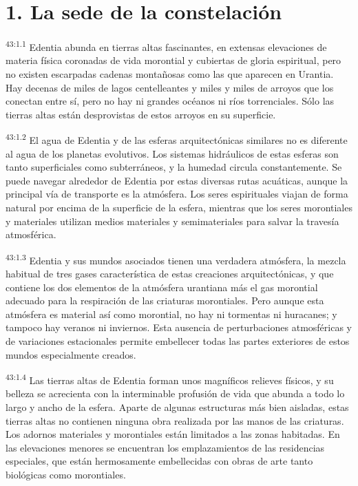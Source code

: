 \section*{1. La sede de la constelación}
\par
\textsuperscript{43:1.1} Edentia abunda en tierras altas fascinantes, en extensas elevaciones de materia física coronadas de vida morontial y cubiertas de gloria espiritual, pero no existen escarpadas cadenas montañosas como las que aparecen en Urantia. Hay decenas de miles de lagos centelleantes y miles y miles de arroyos que los conectan entre sí, pero no hay ni grandes océanos ni ríos torrenciales. Sólo las tierras altas están desprovistas de estos arroyos en su superficie.

\par
\textsuperscript{43:1.2} El agua de Edentia y de las esferas arquitectónicas similares no es diferente al agua de los planetas evolutivos. Los sistemas hidráulicos de estas esferas son tanto superficiales como subterráneos, y la humedad circula constantemente. Se puede navegar alrededor de Edentia por estas diversas rutas acuáticas, aunque la principal vía de transporte es la atmósfera. Los seres espirituales viajan de forma natural por encima de la superficie de la esfera, mientras que los seres morontiales y materiales utilizan medios materiales y semimateriales para salvar la travesía atmosférica.

\par
\textsuperscript{43:1.3} Edentia y sus mundos asociados tienen una verdadera atmósfera, la mezcla habitual de tres gases característica de estas creaciones arquitectónicas, y que contiene los dos elementos de la atmósfera urantiana más el gas morontial adecuado para la respiración de las criaturas morontiales. Pero aunque esta atmósfera es material así como morontial, no hay ni tormentas ni huracanes; y tampoco hay veranos ni inviernos. Esta ausencia de perturbaciones atmosféricas y de variaciones estacionales permite embellecer todas las partes exteriores de estos mundos especialmente creados.

\par
\textsuperscript{43:1.4} Las tierras altas de Edentia forman unos magníficos relieves físicos, y su belleza se acrecienta con la interminable profusión de vida que abunda a todo lo largo y ancho de la esfera. Aparte de algunas estructuras más bien aisladas, estas tierras altas no contienen ninguna obra realizada por las manos de las criaturas. Los adornos materiales y morontiales están limitados a las zonas habitadas. En las elevaciones menores se encuentran los emplazamientos de las residencias especiales, que están hermosamente embellecidas con obras de arte tanto biológicas como morontiales.

